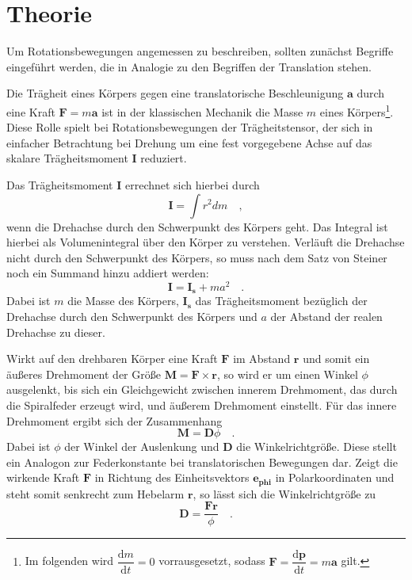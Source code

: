 \section{Theorie}
\label{sec:Theorie}
Um Rotationsbewegungen angemessen zu beschreiben, sollten zunächst Begriffe
eingeführt werden, die in Analogie zu den Begriffen der Translation stehen.

Die Trägheit eines Körpers gegen eine translatorische Beschleunigung $\symbf{a}$
durch eine Kraft $\symbf{F}=m\symbf{a}$ ist in der klassischen Mechanik die
Masse $m$ eines Körpers\footnote{Im folgenden wird
$\dfrac{\mathrm{d}m}{\mathrm{d}t}=0$ vorrausgesetzt, sodass
$\symbf{F}=\dfrac{\mathrm{d}\symbf{p}}{\mathrm{d}t}=m\symbf{a}$ gilt.}.
Diese Rolle spielt bei Rotationsbewegungen der Trägheitstensor, der sich in
einfacher Betrachtung bei Drehung um eine fest vorgegebene Achse auf das skalare
Trägheitsmoment $\symbf{I}$ reduziert.

Das Trägheitsmoment $\symbf{I}$ errechnet sich hierbei durch
\begin{equation}
  \symbf{I}=\int r^2 dm\quad,
  \label{eqn:traegheitallg}
\end{equation}
wenn die Drehachse durch den Schwerpunkt des Körpers geht. Das Integral ist hierbei
als Volumenintegral über den Körper zu verstehen. Verläuft die Drehachse nicht
durch den Schwerpunkt des Körpers, so muss nach dem Satz von Steiner noch ein
Summand hinzu addiert werden:
\begin{equation}
  \symbf{I}=\symbf{I_s}+ma^2\quad.
  \label{eqn:steiner}
\end{equation}
Dabei ist $m$ die Masse des Körpers, $\symbf{I_s}$ das Trägheitsmoment bezüglich
der Drehachse durch den Schwerpunkt des Körpers und $a$ der Abstand der realen
Drehachse zu dieser.

Wirkt auf den drehbaren Körper eine Kraft $\symbf{F}$ im Abstand $\symbf{r}$ und somit ein
äußeres Drehmoment der Größe $\symbf{M}=\symbf{F}\times\symbf{r}$, so wird er um
einen Winkel $\phi$ ausgelenkt, bis sich ein Gleichgewicht zwischen innerem Drehmoment,
das durch die Spiralfeder erzeugt wird, und äußerem Drehmoment einstellt. Für das innere
Drehmoment ergibt sich der Zusammenhang
\begin{equation}
  \symbf{M}=\symbf{D}\phi\quad.
  \label{eqn:drehmoment_innen}
\end{equation}
Dabei ist $\phi$ der Winkel der Auslenkung und $\symbf{D}$ die Winkelrichtgröße.
Diese stellt ein Analogon zur Federkonstante bei translatorischen Bewegungen dar.\cite{wiki:winkelrichtgröße}
Zeigt die wirkende Kraft $\symbf{F}$ in Richtung des Einheitsvektors $\symbf{e_{phi}}$
in Polarkoordinaten und steht somit senkrecht zum Hebelarm $\symbf{r}$, so lässt sich
die Winkelrichtgröße zu
\begin{equation}
  \symbf{D}=\frac{\symbf{F}\symbf{r}}{\phi}\quad.
  \label{eqn:winkelrg}
\end{equation}

